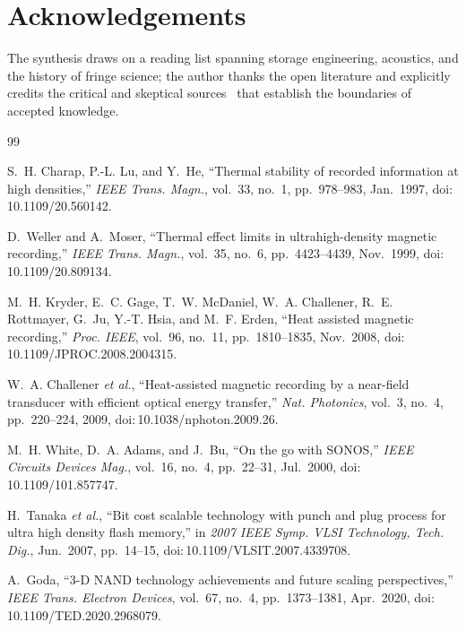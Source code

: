 \documentclass[11pt]{article}
\theoremstyle{definition}
\begin{document}
\section*{Acknowledgements}
The synthesis draws on a reading list spanning storage engineering, acoustics, and the
history of fringe science; the author thanks the open literature and explicitly credits the
critical and skeptical sources~\cite{tegmark2000decoherence,elton2020ez,maddox1988} that
establish the boundaries of accepted knowledge.

\begin{thebibliography}{99}

S.~H. Charap, P.-L. Lu, and Y.~He, ``Thermal stability of recorded information at high
densities,'' \emph{IEEE Trans. Magn.}, vol.~33, no.~1, pp.~978--983, Jan.\ 1997,
doi:\,10.1109/20.560142.

D.~Weller and A.~Moser, ``Thermal effect limits in ultrahigh-density magnetic recording,''
\emph{IEEE Trans. Magn.}, vol.~35, no.~6, pp.~4423--4439, Nov.\ 1999,
doi:\,10.1109/20.809134.

M.~H. Kryder, E.~C. Gage, T.~W. McDaniel, W.~A. Challener, R.~E. Rottmayer, G.~Ju,
Y.-T. Hsia, and M.~F. Erden, ``Heat assisted magnetic recording,'' \emph{Proc. IEEE},
vol.~96, no.~11, pp.~1810--1835, Nov.\ 2008, doi:\,10.1109/JPROC.2008.2004315.

W.~A. Challener \emph{et al.}, ``Heat-assisted magnetic recording by a near-field
transducer with efficient optical energy transfer,'' \emph{Nat. Photonics}, vol.~3, no.~4,
pp.~220--224, 2009, doi:\,10.1038/nphoton.2009.26.

M.~H. White, D.~A. Adams, and J.~Bu, ``On the go with SONOS,'' \emph{IEEE Circuits Devices
Mag.}, vol.~16, no.~4, pp.~22--31, Jul.\ 2000, doi:\,10.1109/101.857747.

H.~Tanaka \emph{et al.}, ``Bit cost scalable technology with punch and plug process for
ultra high density flash memory,'' in \emph{2007 IEEE Symp. VLSI Technology, Tech. Dig.},
Jun.\ 2007, pp.~14--15, doi:\,10.1109/VLSIT.2007.4339708.

A.~Goda, ``3-D NAND technology achievements and future scaling perspectives,'' \emph{IEEE
Trans. Electron Devices}, vol.~67, no.~4, pp.~1373--1381, Apr.\ 2020,
doi:\,10.1109/TED.2020.2968079.


\end{thebibliography}
\end{document}
